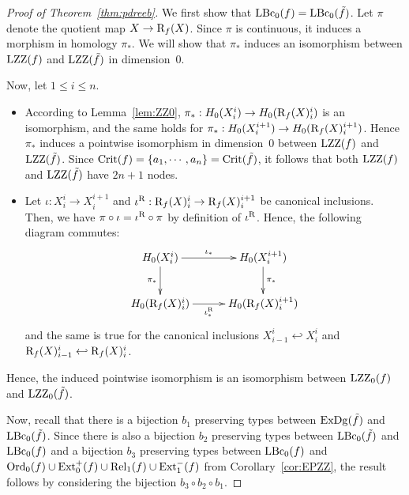 \begin{proof}[Proof of Theorem~\ref{thm:pdreeb}]

We first show that $\mathrm{LBc}_0(f)=\mathrm{LBc}_0(\tilde f)$. Let $\pi$ denote the quotient map $X\rightarrow\mathrm{R}_f(X)$.
Since $\pi$ is continuous, it induces a morphism in homology $\pi_*$. We will show that $\pi_*$ 
induces an isomorphism between $\mathrm{LZZ}(f)$ and $\mathrm{LZZ}(\tilde f)$ in dimension~0.

Now, let $1\leq i\leq n$.

\begin{itemize}
\item According to Lemma~\ref{lem:ZZ0}, $\pi_*:H_0(X_i^i)\rightarrow H_0(\mathrm{R}_f(X)^i_i)$ is an isomorphism, and 
the same holds for $\pi_*:H_0(X_i^{i+1})\rightarrow H_0(\mathrm{R}_f(X)^{i+1}_i)$. Hence $\pi_*$ induces a pointwise isomorphism 
in dimension~0 between $\mathrm{LZZ}(f)$ and $\mathrm{LZZ}(\tilde f)$. Since $\mathrm{Crit}(f)=\{a_1,\cdots,a_n\}=\mathrm{Crit}(\tilde f)$,
it follows that both $\mathrm{LZZ}(f)$ and $\mathrm{LZZ}(\tilde f)$ have $2n+1$ nodes.
\item Let $\iota:X^i_i\rightarrow X_i^{i+1}$ and
 $\iota^{\mathrm{R}}:\mathrm{R}_f(X)^{i}_i\rightarrow \mathrm{R}_f(X)^{i+1}_i$
be canonical inclusions. Then, we have $\pi\circ\iota=\iota^{\rm R}\circ\pi$ 
by definition of $\iota^{\rm R}$.
Hence, the following diagram commutes:
$$\xymatrix@!C{
H_0(X^i_i) \ar[r]^-{\iota_*} \ar[d]_-{\pi_*} & H_0(X^{i+1}_i) \ar[d]^-{\pi_*} \\
H_0(\Reeb_f(X)^i_i) \ar[r]_-{\iota^{\Reeb}_*} & H_0(\Reeb_f(X)^{i+1}_i)
}$$
and the same is true for the canonical inclusions $X^i_{i-1}\hookleftarrow X_i^{i}$ and
 $\mathrm{R}_f(X)^{i}_{i-1}\hookleftarrow \mathrm{R}_f(X)^{i}_i$.
\end{itemize}

Hence, the induced pointwise isomorphism is an isomorphism between $\mathrm{LZZ}_0(f)$ and $\mathrm{LZZ}_0(\tilde f)$.

Now, recall that there is a bijection $b_1$ preserving types between $\mathrm{ExDg}(\tilde f)$ and $\mathrm{LBc}_0(\tilde f)$.
Since there is also a bijection $b_2$ preserving types between $\mathrm{LBc}_0(\tilde f)$ and $\mathrm{LBc}_0(f)$
and a bijection $b_3$ preserving types between $\mathrm{LBc}_0(f)$ and $\mathrm{Ord}_0(f)\cup\mathrm{Ext}_0^+(f)\cup\mathrm{Rel}_1(f)\cup\mathrm{Ext}_1^-(f)$ from Corollary~\ref{cor:EPZZ},
the result follows by considering the bijection $b_3\circ b_2 \circ b_1$. 
\end{proof} 


















